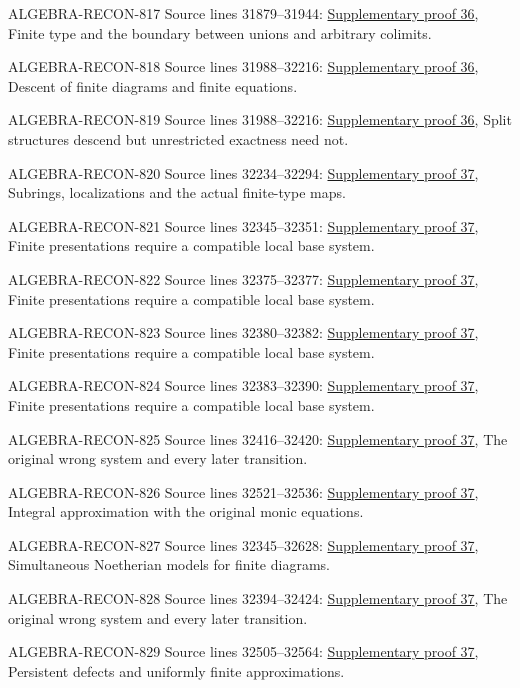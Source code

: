 \begin{AlgebraSourceRoutes}
\item[ALGEBRA-RECON-817] Source lines 31879--31944: \hyperlink{algebra_colimit_categories_notes_20260928}{Supplementary proof 36}, Finite type and the boundary between unions and arbitrary colimits.
\item[ALGEBRA-RECON-818] Source lines 31988--32216: \hyperlink{algebra_colimit_categories_notes_20260928}{Supplementary proof 36}, Descent of finite diagrams and finite equations.
\item[ALGEBRA-RECON-819] Source lines 31988--32216: \hyperlink{algebra_colimit_categories_notes_20260928}{Supplementary proof 36}, Split structures descend but unrestricted exactness need not.
\item[ALGEBRA-RECON-820] Source lines 32234--32294: \hyperlink{algebra_noetherian_approximation_notes_20260928}{Supplementary proof 37}, Subrings, localizations and the actual finite-type maps.
\item[ALGEBRA-RECON-821] Source lines 32345--32351: \hyperlink{algebra_noetherian_approximation_notes_20260928}{Supplementary proof 37}, Finite presentations require a compatible local base system.
\item[ALGEBRA-RECON-822] Source lines 32375--32377: \hyperlink{algebra_noetherian_approximation_notes_20260928}{Supplementary proof 37}, Finite presentations require a compatible local base system.
\item[ALGEBRA-RECON-823] Source lines 32380--32382: \hyperlink{algebra_noetherian_approximation_notes_20260928}{Supplementary proof 37}, Finite presentations require a compatible local base system.
\item[ALGEBRA-RECON-824] Source lines 32383--32390: \hyperlink{algebra_noetherian_approximation_notes_20260928}{Supplementary proof 37}, Finite presentations require a compatible local base system.
\item[ALGEBRA-RECON-825] Source lines 32416--32420: \hyperlink{algebra_noetherian_approximation_notes_20260928}{Supplementary proof 37}, The original wrong system and every later transition.
\item[ALGEBRA-RECON-826] Source lines 32521--32536: \hyperlink{algebra_noetherian_approximation_notes_20260928}{Supplementary proof 37}, Integral approximation with the original monic equations.
\item[ALGEBRA-RECON-827] Source lines 32345--32628: \hyperlink{algebra_noetherian_approximation_notes_20260928}{Supplementary proof 37}, Simultaneous Noetherian models for finite diagrams.
\item[ALGEBRA-RECON-828] Source lines 32394--32424: \hyperlink{algebra_noetherian_approximation_notes_20260928}{Supplementary proof 37}, The original wrong system and every later transition.
\item[ALGEBRA-RECON-829] Source lines 32505--32564: \hyperlink{algebra_noetherian_approximation_notes_20260928}{Supplementary proof 37}, Persistent defects and uniformly finite approximations.
\end{AlgebraSourceRoutes}


